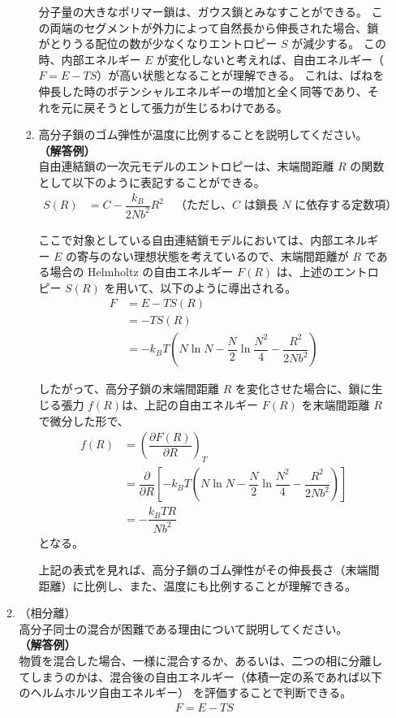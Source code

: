 \documentclass[a4paper,11pt]{ltjsarticle}
\begin{document}
\begin{itemize}
\begin{enumerate}
\begin{enumerate}
		分子量の大きなポリマー鎖は、ガウス鎖とみなすことができる。
		この両端のセグメントが外力によって自然長から伸長された場合、鎖がとりうる配位の数が少なくなりエントロピー $S$ が減少する。
		この時、内部エネルギー $E$ が変化しないと考えれば、自由エネルギー（$F=E-TS$）が高い状態となることが理解できる。
		これは、ばねを伸長した時のポテンシャルエネルギーの増加と全く同等であり、それを元に戻そうとして張力が生じるわけである。

		\item
		\label{it:5-2}
		高分子鎖のゴム弾性が温度に比例することを説明してください。\\
		{\bf（解答例）}\\
		自由連結鎖の一次元モデルのエントロピーは、末端間距離 $R$ の関数として以下のように表記することができる。
		\begin{align*}
		S(R)
			&= C -\dfrac{ k_B}{2Nb^2}R^2 \quad \text{（ただし、$C$ は鎖長 $N$ に依存する定数項）}
		\end{align*}

		ここで対象としている自由連結鎖モデルにおいては、内部エネルギー $E$ の寄与のない理想状態を考えているので、末端間距離が $R$ である場合の 
		Helmholtz の自由エネルギー 	$F(R)$ は、上述のエントロピー $S(R)$ を用いて、以下のように導出される。
		\begin{align*}
		F 	&= E - TS(R) \\
			&= -TS(R) \\
			&= -k_B T \left( N\ln N - \dfrac{N}{2} \ln \dfrac{N^2}{4} - \dfrac{R^2}{2Nb^2} \right) 
		\end{align*}

		したがって、高分子鎖の末端間距離 $R$ を変化させた場合に、鎖に生じる張力 $f(R)$は、上記の自由エネルギー $F(R)$ を末端間距離 $R$ で微分した形で、
		\begin{align*}
		f(R) 	
		&= \left(\dfrac{\partial F(R)}{\partial R} \right)_T \\
			&=\dfrac{\partial}{\partial R} \left[ -k_B T \left( N\ln N - \dfrac{N}{2} \ln \dfrac{N^2}{4} - \dfrac{R^2}{2Nb^2} \right) \right]\\
			&=- \dfrac{k_B T R}{Nb^2}
		\end{align*}
		となる。

		上記の表式を見れば、高分子鎖のゴム弾性がその伸長長さ（末端間距離）に比例し、また、温度にも比例することが理解できる。

		\end{enumerate}
	\item
	（相分離）\\
	\label{it:5-3}
	高分子同士の混合が困難である理由について説明してください。\\
	{\bf（解答例）}\\
	物質を混合した場合、一様に混合するか、あるいは、二つの相に分離してしまうのかは、混合後の自由エネルギー（体積一定の系であれば以下のヘルムホルツ自由エネルギー）
	を評価することで判断できる。
	\begin{align*}
	F=E-TS
	\end{align*}


\end{enumerate}
\end{itemize}
\end{document}
